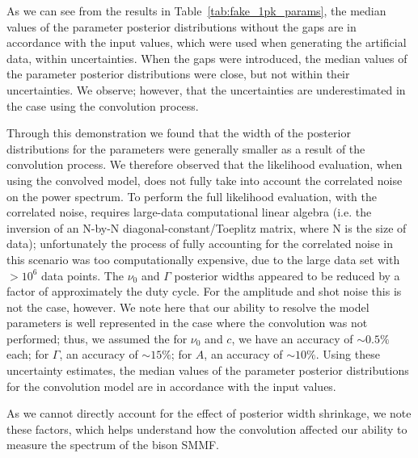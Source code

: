 As we can see from the results in Table~\ref{tab:fake_1pk_params}, the median values of the parameter posterior distributions without the gaps are in accordance with the input values, which were used when generating the artificial data, within uncertainties. When the gaps were introduced, the median values of the parameter posterior distributions were close, but not within their uncertainties. We observe; however, that the uncertainties are underestimated in the case using the convolution process.

Through this demonstration we found that the width of the posterior distributions for the parameters were generally smaller as a result of the convolution process. We therefore observed that the likelihood evaluation, when using the convolved model, does not fully take into account the correlated noise on the power spectrum. To perform the full likelihood evaluation, with the correlated noise, requires large-data computational linear algebra (i.e. the inversion of an N-by-N diagonal-constant/Toeplitz matrix, where N is the size of data); unfortunately the process of fully accounting for the correlated noise in this scenario was too computationally expensive, due to the large data set with $> 10^6$ data points. The $\nu_0$ and $\Gamma$ posterior widths appeared to be reduced by a factor of approximately the duty cycle. For the amplitude and shot noise this is not the case, however. We note here that our ability to resolve the model parameters is well represented in the case where the convolution was not performed; thus, we assumed the for $\nu_0$ and $c$, we have an accuracy of $\sim 0.5\%$ each; for $\Gamma$, an accuracy of $\sim 15\%$; for $A$, an accuracy of $\sim 10\%$. Using these uncertainty estimates, the median values of the parameter posterior distributions for the convolution model are in accordance with the input values.

As we cannot directly account for the effect of posterior width shrinkage, we note these factors, which helps understand how the convolution affected our ability to measure the spectrum of the \gls{bison} SMMF.




